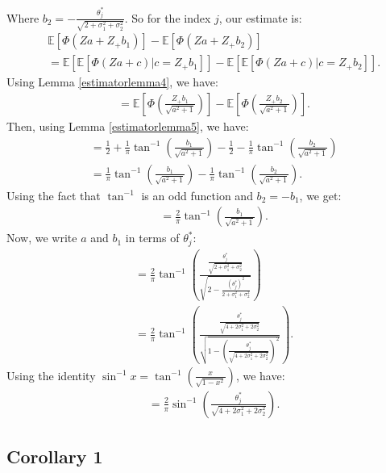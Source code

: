 \documentclass{article} %
\begin{document}
Where $b_2=-\frac{\theta_j^*}{\sqrt{2+\sigma^2_1 + \sigma^2_2}}$. So for the index $j$, our estimate is:
\begin{align*}
&\mathbb{E}[\Phi(Za + Z_{+}b_1)] - \mathbb{E}[\Phi(Za + Z_{+}b_2)]\\
&= \mathbb{E}[\mathbb{E}[\Phi(Za + c)|c = Z_{+}b_1]] - \mathbb{E}[\mathbb{E}[\Phi(Za + c)|c = Z_{+}b_2]].
\end{align*}
Using Lemma \ref{estimatorlemma4}, we have:
\begin{align*}
&= \mathbb{E}\left[\Phi\left(\frac{Z_{+}b_1}{\sqrt{a^2+1}}\right)\right] - \mathbb{E}\left[\Phi\left(\frac{Z_{+}b_2}{\sqrt{a^2+1}}\right)\right].
\end{align*}
Then, using Lemma \ref{estimatorlemma5}, we have:
\begin{align*}
&= \frac{1}{2} + \frac{1}{\pi}\tan^{-1}\left(\frac{b_1}{\sqrt{a^2+1}}\right) - \frac{1}{2} - \frac{1}{\pi}\tan^{-1}\left(\frac{b_2}{\sqrt{a^2+1}}\right)\\
&= \frac{1}{\pi}\tan^{-1}\left(\frac{b_1}{\sqrt{a^2+1}}\right) - \frac{1}{\pi}\tan^{-1}\left(\frac{b_2}{\sqrt{a^2+1}}\right).
\end{align*}
Using the fact that $\tan^{-1}$ is an odd function and $b_2 = -b_1$, we get:
\begin{align*}
&= \frac{2}{\pi}\tan^{-1}\left(\frac{b_1}{\sqrt{a^2+1}}\right).
\end{align*}
Now, we write $a$ and $b_1$ in terms of $\theta_j^*$:
\begin{align*}
&= \frac{2}{\pi}\tan^{-1}\left(\frac{\frac{\theta_j^*}{\sqrt{2+\sigma^2_1 + \sigma^2_2}}}{\sqrt{2-\frac{(\theta_j^*)^2}{2+\sigma^2_1 + \sigma^2_2}}}\right)\\
&= \frac{2}{\pi}\tan^{-1}\left(\frac{\frac{\theta_j^*}{\sqrt{4+2\sigma^2_1 + 2\sigma^2_2}}}{\sqrt{1-\left(\frac{\theta_j^*}{\sqrt{4+2\sigma^2_1 + 2\sigma^2_2}}\right)^2}}\right).
\end{align*}
Using the identity $\sin^{-1}x = \tan^{-1}\left(\frac{x}{\sqrt{1-x^2}}\right)$, we have:
\begin{align*}
&= \frac{2}{\pi}\sin^{-1}\left(\frac{\theta_j^*}{\sqrt{4+2\sigma^2_1 + 2\sigma^2_2}}\right).
\end{align*}

\subsection{Corollary 1}

\cdfprediction*
\end{document}
